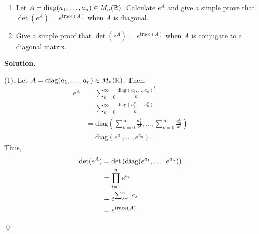 \documentclass[12pt]{book}
\theoremstyle{definition}
\newenvironment{solution}
{%
  \par\noindent\textbf{Solution.}\quad
}
{%
  \qed\par
}
\begin{document}
\begin{taggedexercise}[\textcolor{green}{Complete}]
  \begin{enumerate}
    \item Let $A = \text{diag}(a_1, \dots, a_n) \in M_n(\mathbb{R})$. Calculate $e^A$ and give a simple prove that $\det(e^A) = e^{\text{trace}(A)}$ when $A$ is diagonal.
    \item Give a simple proof that $\det(e^A) = e^{\text{trace}(A)}$ when $A$ is conjugate to a diagonal matrix.
  \end{enumerate}
\end{taggedexercise}

\begin{solution}
  (1). Let $A = \text{diag}(a_1, \dots, a_n) \in M_n(\mathbb{R})$.
  Then,
  \[
  \begin{aligned}
    e^{A} &= \sum_{k=0}^\infty \frac{\text{diag}(a_1, \dots, a_n)^k}{k!} \\
          &= \sum_{k=0}^\infty \frac{\text{diag}(a_1^k, \dots, a_n^k)}{k!} \\
          &= \text{diag}\left(\sum_{k=0}^\infty \frac{a_1^k}{k!}, \dots , \sum_{k=0}^\infty \frac{a_n^k}{k!} \right) \\
          &= \text{diag}(e^{a_1}, \dots , e^{a_n}).
  \end{aligned}
  \]
  Thus,
  \[
  \begin{aligned}
  \det(e^A) &= \det \left(\text{diag}(e^{a_1}, \dots , e^{a_n})\right)\\
            &= \prod_{i = 1}^{n}e^{a_i} \\
            &= e^{\sum_{j=1}^n a_j} \\
            &= e^{\text{trace}({A})}
  \end{aligned}
  \]


\end{solution}
\end{document}
